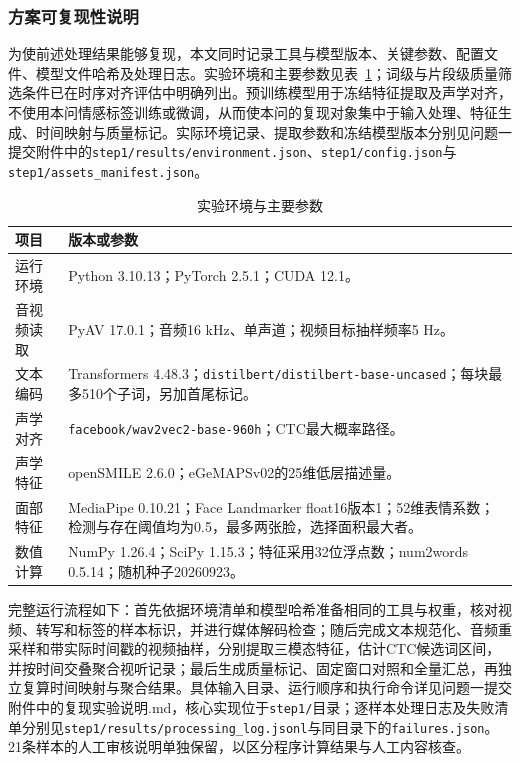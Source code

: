\subsubsection{方案可复现性说明}
\label{sec:p1_reproducibility}

为使前述处理结果能够复现，本文同时记录工具与模型版本、关键参数、配置文件、模型文件哈希及处理日志。实验环境和主要参数见表~\ref{tab:p1_repro_settings}；词级与片段级质量筛选条件已在时序对齐评估中明确列出。预训练模型用于冻结特征提取及声学对齐，不使用本问情感标签训练或微调，从而使本问的复现对象集中于输入处理、特征生成、时间映射与质量标记。实际环境记录、提取参数和冻结模型版本分别见问题一提交附件中的\nolinkurl{step1/results/environment.json}、\nolinkurl{step1/config.json}与\nolinkurl{step1/assets_manifest.json}。

\begin{table}[H]
    \centering\small
    \caption{实验环境与主要参数}
    \label{tab:p1_repro_settings}
    \setlength{\tabcolsep}{6pt}
    \renewcommand{\arraystretch}{1.12}
    \ifdefined\pOneCompactTableBox\else\newsavebox{\pOneCompactTableBox}\fi
    \begin{lrbox}{\pOneCompactTableBox}
    \begin{tabular}{l>{\raggedright\arraybackslash}p{27em}}
        \toprule
        项目 & 版本或参数\\
        \midrule
        运行环境 & Python 3.10.13；PyTorch 2.5.1；CUDA 12.1。\\
        音视频读取 & PyAV 17.0.1；音频16 kHz、单声道；视频目标抽样频率5 Hz。\\
        文本编码 & Transformers 4.48.3；\nolinkurl{distilbert/distilbert-base-uncased}；每块最多510个子词，另加首尾标记。\\
        声学对齐 & \nolinkurl{facebook/wav2vec2-base-960h}；CTC最大概率路径。\\
        声学特征 & openSMILE 2.6.0；eGeMAPSv02的25维低层描述量。\\
        面部特征 & MediaPipe 0.10.21；Face Landmarker float16版本1；52维表情系数；检测与存在阈值均为0.5，最多两张脸，选择面积最大者。\\
        数值计算 & NumPy 1.26.4；SciPy 1.15.3；特征采用32位浮点数；num2words 0.5.14；随机种子20260923。\\
        \bottomrule
    \end{tabular}
    \end{lrbox}
    \usebox{\pOneCompactTableBox}
\end{table}

完整运行流程如下：首先依据环境清单和模型哈希准备相同的工具与权重，核对视频、转写和标签的样本标识，并进行媒体解码检查；随后完成文本规范化、音频重采样和带实际时间戳的视频抽样，分别提取三模态特征，估计CTC候选词区间，并按时间交叠聚合视听记录；最后生成质量标记、固定窗口对照和全量汇总，再独立复算时间映射与聚合结果。具体输入目录、运行顺序和执行命令详见问题一提交附件中的\textnormal{复现实验说明.md}，核心实现位于\nolinkurl{step1/}目录；逐样本处理日志及失败清单分别见\nolinkurl{step1/results/processing_log.jsonl}与同目录下的\nolinkurl{failures.json}。21条样本的人工审核说明单独保留，以区分程序计算结果与人工内容核查。

